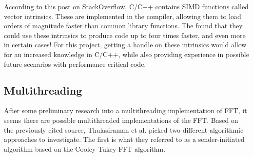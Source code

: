 \documentclass[12pt]{extarticle}
\begin{document}
    According to this post\cite{Konstantin:2020} on StackOverflow, C/C++ contains SIMD functions called vector intrinsics.
    These are implemented in the compiler, allowing them to load orders of magnitude faster than common library functions. 
    The found that they could use these intrinsics to produce code up to four times faster, and even more in certain cases!
    For this project, getting a handle on these intrinsics would allow for an increased knowledge in C/C++, while also providing
    experience in possible future scenarios with performance critical code.

\subsection*{Multithreading}
    After some preliminary research into a multithreading implementation of FFT\cite{Thulasiraman:2021}, it seems there are
    possible multithreaded implementations of the FFT. Based on the previously cited source, Thulasiraman et al. picked two 
    different algorithmic approaches to investigate. The first is what they referred to as a sender-initiated algorithm based
    on the Cooley-Tukey FFT algorithm.


\end{document}
